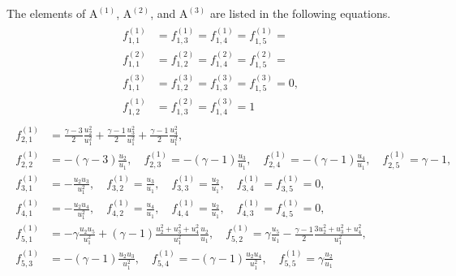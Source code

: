 \documentclass{turgon}
\begin{document}
The elements of $\mathrm{A^{(1)}}$, $\mathrm{A^{(2)}}$, and $\mathrm{A^{(3)}}$
are listed in the following equations.
%
\begin{align}
  \begin{aligned}
    f^{(1)}_{1,1} &= f^{(1)}_{1,3} = f^{(1)}_{1,4} = f^{(1)}_{1,5} = \\
    f^{(2)}_{1,1} &= f^{(2)}_{1,2} = f^{(2)}_{1,4} = f^{(2)}_{1,5} = \\
    f^{(3)}_{1,1} &= f^{(3)}_{1,2} = f^{(3)}_{1,3} = f^{(3)}_{1,5} = 0, \\
    f^{(1)}_{1,2} &= f^{(2)}_{1,3} = f^{(3)}_{1,4} = 1
  \end{aligned}
  \label{e:euler:jaco0}
\end{align}
%
\begin{align}
  \begin{aligned}
    f^{(1)}_{2,1} &= \frac{\gamma-3}{2}\frac{u_2^2}{u_1^2}
    + \frac{\gamma-1}{2}\frac{u_3^2}{u_1^2}
    + \frac{\gamma-1}{2}\frac{u_4^2}{u_1^2}, \\
    f^{(1)}_{2,2} &= -(\gamma-3)\frac{u_2}{u_1}, \quad
    f^{(1)}_{2,3} = -(\gamma-1)\frac{u_3}{u_1}, \quad
    f^{(1)}_{2,4} = -(\gamma-1)\frac{u_4}{u_1}, \quad
    f^{(1)}_{2,5} = \gamma-1, \\
    f^{(1)}_{3,1} &= -\frac{u_2u_3}{u_1^2}, \quad
    f^{(1)}_{3,2} = \frac{u_3}{u_1}, \quad
    f^{(1)}_{3,3} = \frac{u_2}{u_1}, \quad
    f^{(1)}_{3,4} = f^{(1)}_{3,5} = 0, \\
    f^{(1)}_{4,1} &= -\frac{u_2u_4}{u_1^2}, \quad
    f^{(1)}_{4,2} = \frac{u_4}{u_1}, \quad
    f^{(1)}_{4,4} = \frac{u_2}{u_1}, \quad
    f^{(1)}_{4,3} = f^{(1)}_{4,5} = 0, \\
    f^{(1)}_{5,1} &= -\gamma\frac{u_2u_5}{u_1^2}
    + (\gamma-1)\frac{u_2^2+u_3^2+u_4^2}{u_1^2}\frac{u_2}{u_1}, \quad
    f^{(1)}_{5,2} = \gamma\frac{u_5}{u_1}
    - \frac{\gamma-1}{2}\frac{3u_2^2 + u_3^2 + u_4^2}{u_1^2}, \\
    f^{(1)}_{5,3} &= -(\gamma-1)\frac{u_2u_3}{u_1^2}, \quad
    f^{(1)}_{5,4} = -(\gamma-1)\frac{u_2u_4}{u_1^2}, \quad
    f^{(1)}_{5,5} = \gamma\frac{u_2}{u_1}
  \end{aligned}
  \label{e:euler:jaco1}
\end{align}
%
\end{document}
